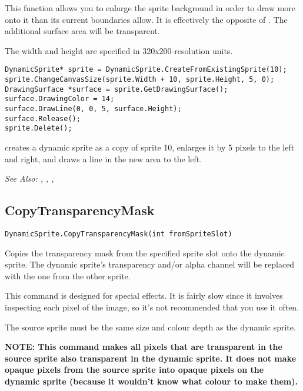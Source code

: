 This function allows you to enlarge the sprite background in order to draw
more onto it than its current boundaries allow. It is effectively the
opposite of . The additional surface area
will be transparent.

The width and height are specified in 320x200-resolution units.

\begin{verbatim}
DynamicSprite* sprite = DynamicSprite.CreateFromExistingSprite(10);
sprite.ChangeCanvasSize(sprite.Width + 10, sprite.Height, 5, 0);
DrawingSurface *surface = sprite.GetDrawingSurface();
surface.DrawingColor = 14;
surface.DrawLine(0, 0, 5, surface.Height);
surface.Release();
sprite.Delete();
\end{verbatim}
creates a dynamic sprite as a copy of sprite 10, enlarges it by 5 pixels to the
left and right, and draws a line in the new area to the left.

\it{See Also:} ,
,
,


\subsection{CopyTransparencyMask}\label{DynamicSprite.CopyTransparencyMask}%

\begin{verbatim}
DynamicSprite.CopyTransparencyMask(int fromSpriteSlot)
\end{verbatim}
Copies the transparency mask from the specified sprite slot onto the dynamic sprite.
The dynamic sprite's transparency and/or alpha channel will be replaced with the
one from the other sprite.

This command is designed for special effects. It is fairly slow since it involves
inspecting each pixel of the image, so it's not recommended that you use it often.

The source sprite must be the same size and colour depth as the dynamic sprite.

\bf{NOTE:} This command makes all pixels that are transparent in the source sprite
also transparent in the dynamic sprite. It does not make opaque pixels from the
source sprite into opaque pixels on the dynamic sprite (because it wouldn't know
what colour to make them).

